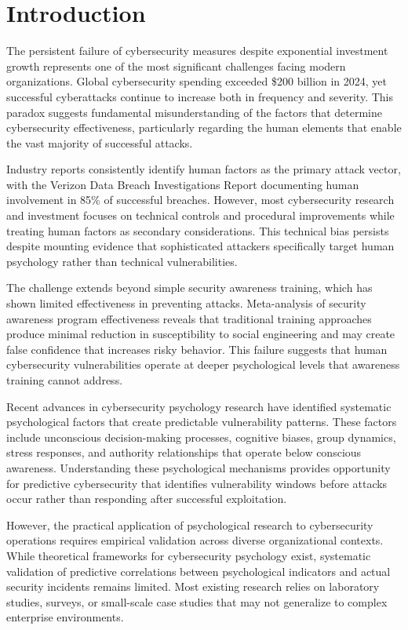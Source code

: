 \documentclass[10pt, twocolumn]{article}
\begin{document}
\section{Introduction}

The persistent failure of cybersecurity measures despite exponential investment growth represents one of the most significant challenges facing modern organizations. Global cybersecurity spending exceeded \$200 billion in 2024, yet successful cyberattacks continue to increase both in frequency and severity\cite{gartner2024}. This paradox suggests fundamental misunderstanding of the factors that determine cybersecurity effectiveness, particularly regarding the human elements that enable the vast majority of successful attacks.

Industry reports consistently identify human factors as the primary attack vector, with the Verizon Data Breach Investigations Report documenting human involvement in 85\% of successful breaches\cite{verizon2024}. However, most cybersecurity research and investment focuses on technical controls and procedural improvements while treating human factors as secondary considerations. This technical bias persists despite mounting evidence that sophisticated attackers specifically target human psychology rather than technical vulnerabilities.

The challenge extends beyond simple security awareness training, which has shown limited effectiveness in preventing attacks\cite{sans2024}. Meta-analysis of security awareness program effectiveness reveals that traditional training approaches produce minimal reduction in susceptibility to social engineering and may create false confidence that increases risky behavior\cite{cain2024}. This failure suggests that human cybersecurity vulnerabilities operate at deeper psychological levels that awareness training cannot address.

Recent advances in cybersecurity psychology research have identified systematic psychological factors that create predictable vulnerability patterns. These factors include unconscious decision-making processes, cognitive biases, group dynamics, stress responses, and authority relationships that operate below conscious awareness\cite{canale2024}. Understanding these psychological mechanisms provides opportunity for predictive cybersecurity that identifies vulnerability windows before attacks occur rather than responding after successful exploitation.

However, the practical application of psychological research to cybersecurity operations requires empirical validation across diverse organizational contexts. While theoretical frameworks for cybersecurity psychology exist, systematic validation of predictive correlations between psychological indicators and actual security incidents remains limited. Most existing research relies on laboratory studies, surveys, or small-scale case studies that may not generalize to complex enterprise environments.
\end{document}
